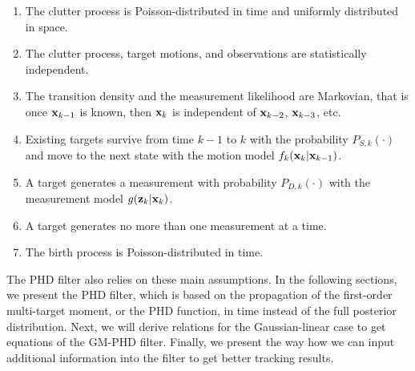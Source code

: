 \begin{enumerate}
    \item The clutter process is Poisson-distributed in time and uniformly distributed in space.
    \item The clutter process, target motions, and observations are statistically independent.
    \item The transition density and the measurement likelihood are Markovian, that is once $\vecat{x}{k-1}$ is known, then $\vecat{x}{k}$ is independent of $\vecat{x}{k-2}$, $\vecat{x}{k-3}$, etc.
    \item Existing targets survive from time $k-1$ to $k$ with the probability $P_{S,k}(\cdot)$ and move to the next state with the motion model $f_k(\vecat{x}{k} | \vecat{x}{k-1})$.
    \item A target generates a measurement with probability $P_{D,k}(\cdot)$ with the measurement model $g(\vecat{z}{k} | \vecat{x}{k})$.
    \item A target generates no more than one measurement at a time.
    \item The birth process is Poisson-distributed in time.
\end{enumerate}

The PHD filter also relies on these main assumptions. In the following sections, we present the PHD filter, which is based on the propagation of the first-order multi-target moment, or the PHD function, in time instead of the full posterior distribution. Next, we will derive relations for the Gaussian-linear case to get equations of the GM-PHD filter. Finally, we present the way how we can input additional information into the filter to get better tracking results.

